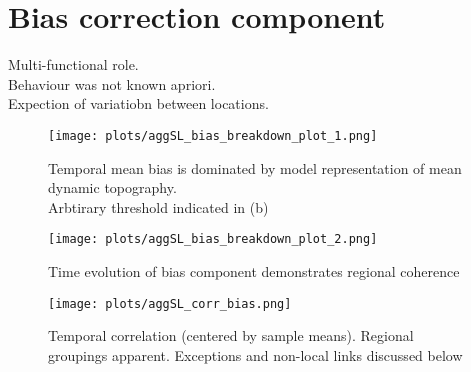\section{Bias correction component}

Multi-functional role.\\
Behaviour was not known apriori.\\
Expection of variatiobn between locations.


\begin{figure}[H]
\centering
\texttt{[image: plots/aggSL\_bias\_breakdown\_plot\_1.png]}
\caption{ Temporal mean bias is dominated by model representation of mean dynamic topography.\\Arbtirary threshold indicated in (b)}
\end{figure}   


\begin{figure}[H]
\centering
\texttt{[image: plots/aggSL\_bias\_breakdown\_plot\_2.png]}
\caption{ Time evolution of bias component demonstrates regional coherence }
\end{figure}  


\begin{figure}[H]
\centering
\texttt{[image: plots/aggSL\_corr\_bias.png]}
\caption{ Temporal correlation (centered by sample means).   Regional groupings apparent.  Exceptions and non-local links discussed below }
\end{figure}   





